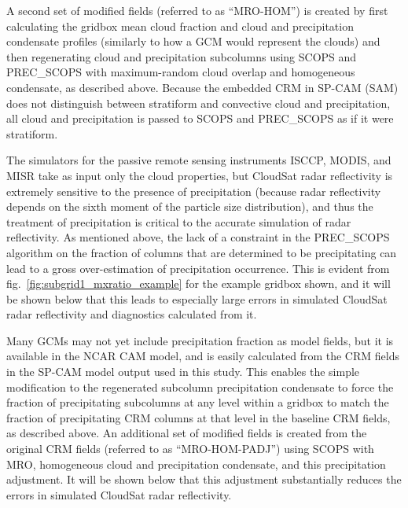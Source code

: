 A second set of modified fields (referred to as ``MRO-HOM'') is created
by first calculating the gridbox mean cloud fraction and cloud and
precipitation condensate profiles (similarly to how a GCM would
represent the clouds) and then regenerating cloud and precipitation
subcolumns using SCOPS and PREC\_SCOPS with maximum-random cloud overlap
and homogeneous condensate, as described above. Because the embedded CRM
in SP-CAM (SAM) does not distinguish between stratiform and convective
cloud and precipitation, all cloud and precipitation is passed to SCOPS
and PREC\_SCOPS as if it were stratiform.

The simulators for the passive remote sensing instruments ISCCP, MODIS,
and MISR take as input only the cloud properties, but CloudSat radar
reflectivity is extremely sensitive to the presence of precipitation
(because radar reflectivity depends on the sixth moment of the particle
size distribution), and thus the treatment of precipitation is critical
to the accurate simulation of radar reflectivity. As mentioned above,
the lack of a constraint in the PREC\_SCOPS algorithm on the fraction of
columns that are determined to be precipitating can lead to a gross
over-estimation of precipitation occurrence. This is evident from
fig.~\ref{fig:subgrid1_mxratio_example} for the example gridbox shown,
and it will be shown below that this leads to especially large errors in
simulated CloudSat radar reflectivity and diagnostics calculated from
it.

Many GCMs may not yet include precipitation fraction as model fields,
but it is available in the NCAR CAM model, and is easily calculated from
the CRM fields in the SP-CAM model output used in this study. This
enables the simple modification to the regenerated subcolumn
precipitation condensate to force the fraction of precipitating
subcolumns at any level within a gridbox to match the fraction of
precipitating CRM columns at that level in the baseline CRM fields, as
described above. An additional set of modified fields is created from
the original CRM fields (referred to as ``MRO-HOM-PADJ'') using SCOPS
with MRO, homogeneous cloud and precipitation condensate, and this
precipitation adjustment. It will be shown below that this adjustment
substantially reduces the errors in simulated CloudSat radar
reflectivity.

